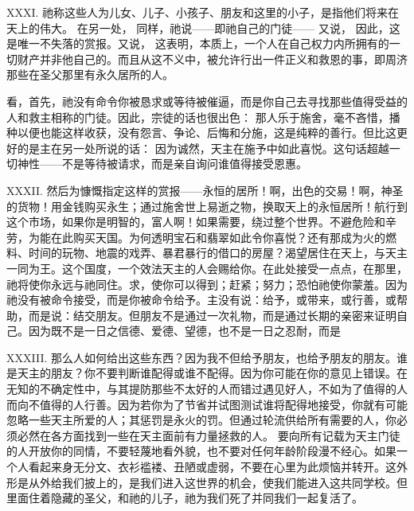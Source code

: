 XXXI. 祂称这些人为儿女、儿子、小孩子、朋友和这里的小子，是指他们将来在天上的伟大。 在另一处， 同样，祂说——即祂自己的门徒—— 又说， 因此，这是唯一不失落的赏报。又说， 这表明，本质上，一个人在自己权力内所拥有的一切财产并非他自己的。而且从这不义中，被允许行出一件正义和救恩的事，即周济那些在圣父那里有永久居所的人。\par

看，首先，祂没有命令你被恳求或等待被催逼，而是你自己去寻找那些值得受益的人和救主相称的门徒。因此，宗徒的话也很出色： 那人乐于施舍，毫不吝惜，播种以便也能这样收获，没有怨言、争论、后悔和分施，这是纯粹的善行。但比这更好的是主在另一处所说的话： 因为诚然，天主在施予中如此喜悦。这句话超越一切神性——不是等待被请求，而是亲自询问谁值得接受恩惠。\par

XXXII. 然后为慷慨指定这样的赏报——永恒的居所！啊，出色的交易！啊，神圣的货物！用金钱购买永生；通过施舍世上易逝之物，换取天上的永恒居所！航行到这个市场，如果你是明智的，富人啊！如果需要，绕过整个世界。不避危险和辛劳，为能在此购买天国。为何透明宝石和翡翠如此令你喜悦？还有那成为火的燃料、时间的玩物、地震的戏弄、暴君暴行的借口的房屋？渴望居住在天上，与天主一同为王。这个国度，一个效法天主的人会赐给你。在此处接受一点点，在那里，祂将使你永远与祂同住。求，使你可以得到；赶紧；努力；恐怕祂使你蒙羞。因为祂没有被命令接受，而是你被命令给予。主没有说：给予，或带来，或行善，或帮助，而是说：结交朋友。但朋友不是通过一次礼物，而是通过长期的亲密来证明自己。因为既不是一日之信德、爱德、望德，也不是一日之忍耐，而是\par

XXXIII. 那么人如何给出这些东西？因为我不但给予朋友，也给予朋友的朋友。谁是天主的朋友？你不要判断谁配得或谁不配得。因为你可能在你的意见上错误。在无知的不确定性中，与其提防那些不太好的人而错过遇见好人，不如为了值得的人而向不值得的人行善。因为若你为了节省并试图测试谁将配得地接受，你就有可能忽略一些天主所爱的人；其惩罚是永火的罚。但通过轮流供给所有需要的人，你必须必然在各方面找到一些在天主面前有力量拯救的人。 要向所有记载为天主门徒的人开放你的同情，不要轻蔑地看外貌，也不要对任何年龄阶段漫不经心。如果一个人看起来身无分文、衣衫褴褛、丑陋或虚弱，不要在心里为此烦恼并转开。这外形是从外给我们披上的，是我们进入这世界的机会，使我们能进入这共同学校。但里面住着隐藏的圣父，和祂的儿子，祂为我们死了并同我们一起复活了。\par

